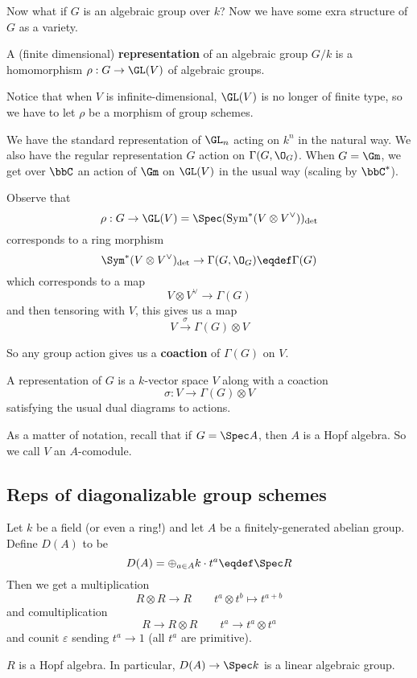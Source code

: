 \documentclass[12pt]{article}
\begin{document}
Now what if $G$ is an algebraic group over $k$? Now we have some exra structure of $G$ as a variety.
\begin{defn}
	A (finite dimensional) \textbf{representation} of an algebraic group $G/k$ is a homomorphism $\rho:G\to \GL(V)$ of algebraic groups.
\end{defn}
\begin{rmk}
	Notice that when $V$ is infinite-dimensional, $\GL(V)$ is no longer of finite type, so we have to let $\rho$ be a 
	morphism of group schemes.
\end{rmk}
We have the standard representation of $\GL_n$ acting on $k^n$ in the natural way. We also have the regular representation 
$G$ action on $\Gamma(G,\O_G)$. When $G=\Gm$, we get over $\bbC$ an action of $\Gm$ on $\GL(V)$ in the usual way (scaling by $\bbC^\ast$).

Observe that 
\[\rho:G\to \GL(V)=\Spec(\operatorname{Sym}^\ast(V\otimes V^\vee))_{\det}\]
corresponds to a ring morphism 
\[\Sym^\ast(V\otimes V^\vee)_{\det}\to \Gamma(G,\O_G)\eqdef \Gamma(G)\]
which corresponds to a map 
\[V\otimes V^\vee\to \Gamma(G)\]
and then tensoring with $V$, this gives us a map
\[V\xrightarrow{\sigma}\Gamma(G)\otimes V\]

So any group action gives us a \textbf{coaction} of $\Gamma(G)$ on $V$.
\begin{defn}
	A representation of $G$ is a $k$-vector space $V$ along with a coaction 
	\[\sigma:V\to \Gamma(G)\otimes V\]
	satisfying the usual dual diagrams to actions.
\end{defn}

\begin{rmk}
	As a matter of notation, recall that if $G=\Spec A$, then $A$ is a Hopf algebra. So we call $V$ an $A$-comodule.
\end{rmk}

\subsection{Reps of diagonalizable group schemes}
Let $k$ be a field (or even a ring!) and let $A$ be a finitely-generated abelian group. Define $D(A)$ to be 
\[D(A)=\oplus_{a\in A}k\cdot t^a\eqdef \Spec R\]
Then we get a multiplication 
\[R\otimes R\to R\qquad t^a\otimes t^b\mapsto t^{a+b}\]
and comultiplication
\[R\to R\otimes R\qquad t^a\to t^a\otimes t^a\]
and counit $\varepsilon$ sending $t^a\to 1$ (all $t^a$ are primitive).
\begin{prop}
	$R$ is a Hopf algebra. In particular, $D(A)\to \Spec k$ is a linear algebraic group.
\end{prop}
\end{document}
